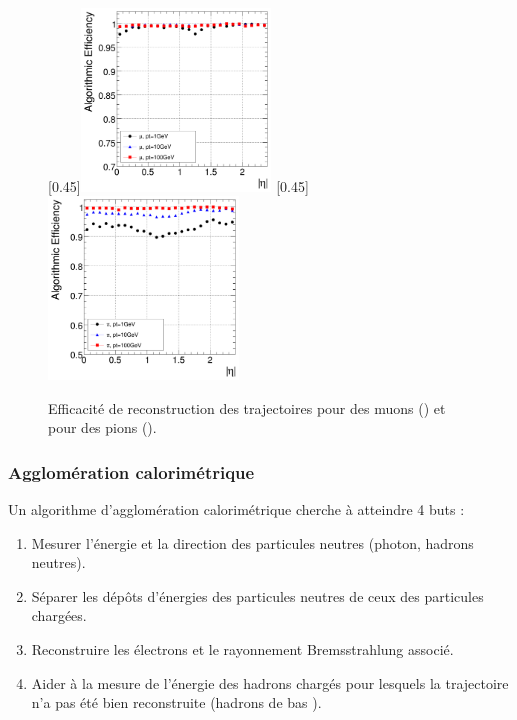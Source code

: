 \begin{figure} \centering
  \subcaptionbox{\label{fig:tracking_eff_mu}}[0.45\textwidth]{\includegraphics[width=0.45\textwidth]{chapitre3/figs/iterative_tracking_mu.pdf}}\hfill
  \subcaptionbox{\label{fig:tracking_eff_pi}}[0.45\textwidth]{\includegraphics[width=0.45\textwidth]{chapitre3/figs/iterative_tracking_pi.pdf}}
  \caption{Efficacité de reconstruction des trajectoires pour des muons () et pour des pions ().}
  \label{fig:iterative_tracking_eff}
\end{figure}

\subsubsection{Agglomération calorimétrique}

Un algorithme d'agglomération calorimétrique cherche à atteindre 4 buts :
\begin{enumerate}
  \item Mesurer l'énergie et la direction des particules neutres (photon, hadrons neutres).
  \item Séparer les dépôts d'énergies des particules neutres de ceux des particules chargées.
  \item Reconstruire les électrons et le rayonnement Bremsstrahlung associé.
  \item Aider à la mesure de l'énergie des hadrons chargés pour lesquels la trajectoire n'a pas été bien reconstruite (hadrons de bas \pt).
\end{enumerate}

